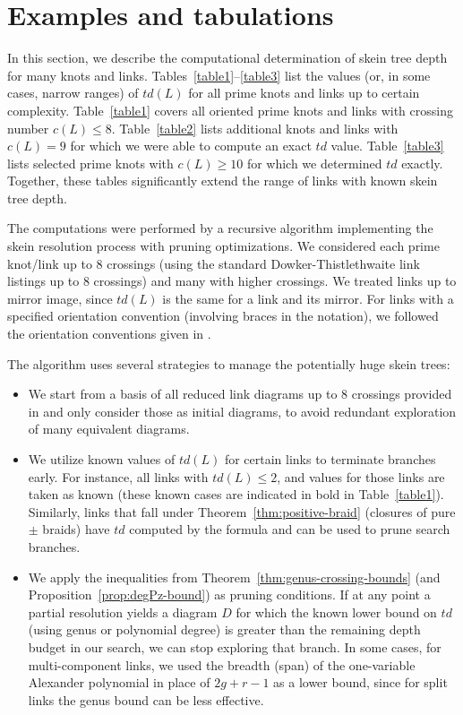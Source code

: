 \documentclass[pdftex, a4paper, 12pt, oneside]{amsart}
\numberwithin{equation}{section}
\theoremstyle{plain}
\theoremstyle{definition}
\begin{document}
	\section{Examples and tabulations}\label{s7}
	In this section, we describe the computational determination of skein tree depth for many knots and links. Tables~\ref{table1}--\ref{table3} list the values (or, in some cases, narrow ranges) of $td(L)$ for all prime knots and links up to certain complexity. Table~\ref{table1} covers all oriented prime knots and links with crossing number $c(L)\le 8$. Table~\ref{table2} lists additional knots and links with $c(L)=9$ for which we were able to compute an exact $td$ value. Table~\ref{table3} lists selected prime knots with $c(L)\ge 10$ for which we determined $td$ exactly. Together, these tables significantly extend the range of links with known skein tree depth.
	
	The computations were performed by a recursive algorithm implementing the skein resolution process with pruning optimizations. We considered each prime knot/link up to 8 crossings (using the standard Dowker-Thistlethwaite link listings up to 8 crossings) and many with higher crossings. We treated links up to mirror image, since $td(L)$ is the same for a link and its mirror. For links with a specified orientation convention (involving braces in the notation), we followed the orientation conventions given in \cite{LivMoo23}.
	
	The algorithm uses several strategies to manage the potentially huge skein trees:
	\begin{itemize}\setlength\itemsep{0pt}
		\item We start from a basis of all reduced link diagrams up to 8 crossings provided in \cite{Jab19} and only consider those as initial diagrams, to avoid redundant exploration of many equivalent diagrams.
		\item We utilize known values of $td(L)$ for certain links to terminate branches early. For instance, all links with $td(L)\le 2$, and values for those links are taken as known (these known cases are indicated in bold in Table~\ref{table1}). Similarly, links that fall under Theorem~\ref{thm:positive-braid} (closures of pure $\pm$ braids) have $td$ computed by the formula and can be used to prune search branches.
		\item We apply the inequalities from Theorem~\ref{thm:genus-crossing-bounds} (and Proposition~\ref{prop:degPz-bound}) as pruning conditions. If at any point a partial resolution yields a diagram $D$ for which the known lower bound on $td$ (using genus or polynomial degree) is greater than the remaining depth budget in our search, we can stop exploring that branch. In some cases, for multi-component links, we used the breadth (span) of the one-variable Alexander polynomial in place of $2g + r - 1$ as a lower bound, since for split links the genus bound can be less effective.
	\end{itemize}
	
\end{document}
